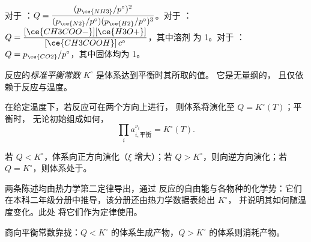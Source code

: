 \begin{example}[三个反应商]\label{ex:b1:extent-q-and-k:quotients}
对于 ：$Q = \dfrac{(p_{\ce{NH3}}/p^\circ)^2}
{(p_{\ce{N2}}/p^\circ)(p_{\ce{H2}}/p^\circ)^3}$。对于
：$Q =
\dfrac{[\ce{CH3COO-}][\ce{H3O+}]}{[\ce{CH3COOH}]\,c^\circ}$，其中溶剂
为 1。对于 ：$Q =
p_{\ce{CO2}}/p^\circ$，其中固体均为 1。
\end{example}

\begin{definition}[标准平衡常数]\label{def:b1:extent-q-and-k:equilibrium-constant}
反应的\emph{标准平衡常数}
$K^\circ$ 是体系达到平衡时其所取的值。
它是无量纲的，
且仅依赖于反应与温度。
\end{definition}

\begin{theorem}[质量作用定律]\label{thm:b1:extent-q-and-k:mass-action}
在给定温度下，若反应可在两个方向上进行，
则体系将演化至 $Q = K^\circ(T)$；平衡时，
无论初始组成如何，
\[
  \prod_i a_{i,\text{平衡}}^{\nu_i} = K^\circ(T) .
\]
\end{theorem}
\admitted

\begin{proposition}[演化方向]\label{prop:b1:extent-q-and-k:direction}
若 $Q < K^\circ$，体系向正方向演化（$\xi$
增大）；若 $Q > K^\circ$，则向逆方向演化；若
$Q = K^\circ$，则体系处于。
\end{proposition}
\admitted

\begin{remark}[这些定律的来源]\label{rem:b1:extent-q-and-k:origin}
两条陈述均由热力学第二定律导出，通过
反应的自由能与各物种的化学势：它们
在本科二年级分册中推导，该分册还由热力学数据表给出 $K^\circ$，
并说明其如何随温度变化。此处
将它们作为定律使用。
\end{remark}

\begin{omfigure}

{\small 商向平衡常数靠拢：$Q <
K^\circ$ 的体系生成产物，$Q > K^\circ$ 的体系则消耗产物。}
\end{omfigure}

